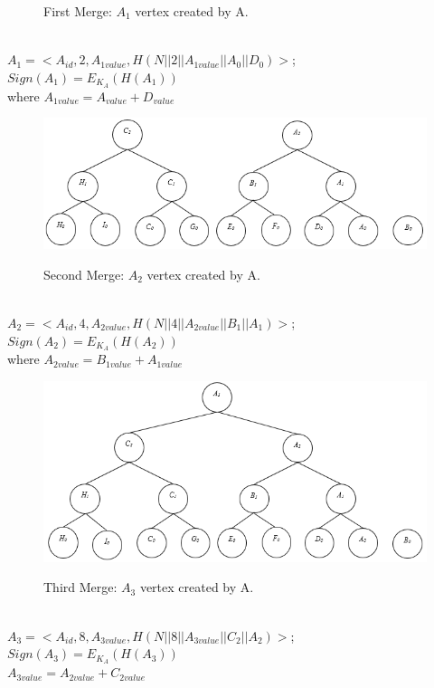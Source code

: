 \begin{exmp}
\begin{figure}[h!]
					\caption{First Merge: $A_{1}$ vertex created by A.}
					\label{fig:commitment-tree-example-2}
				\end{figure}\\
				$A_{1} = <A_{id}, 2, A_{1value}, H(N||2||A_{1value}||A_{0}||D_{0})>$; $Sign(A_{1}) = E_{K_{A}}(H(A_{1}))$\\
				where $A_{1value} = A_{value} + D_{value} $\\
				\begin{figure}[h!]
					\centering
					\includegraphics[scale = 1]{images/commitment-tree-example-3.png}\\
					\caption{Second Merge: $A_{2}$ vertex created by A.}
					\label{fig:commitment-tree-example-3}
				\end{figure}\\
				$A_{2} = <A_{id}, 4, A_{2value}, H(N||4||A_{2value}||B_{1}||A_{1}) >$; $Sign(A_{2}) = E_{K_{A}}(H({A_{2}}))$\\
				where $A_{2value} = B_{1value} + A_{1value} $\\
				\begin{figure}[h!]
					\centering
					\includegraphics[scale = 1]{images/commitment-tree-example-4.png}\\
					\caption{Third Merge: $A_{3}$ vertex created by A.}
					\label{fig:commitment-tree-example-4}
				\end{figure}\\
				$A_{3} = <A_{id},8, A_{3value},H(N||8||A_{3value}||C_{2}||A_{2})>$; $Sign(A_{3}) = E_{K_{A}}(H(A_{3}))$\\
				$A_{3value} = A_{2value} + C_{2value}$
			\end{exmp}


